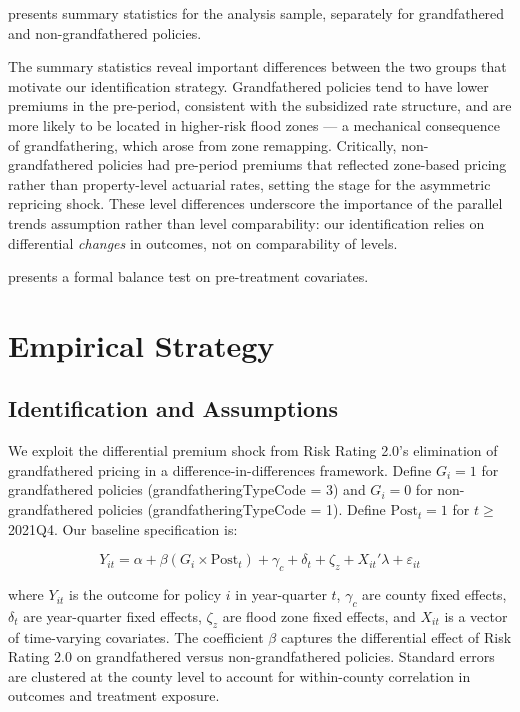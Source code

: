 \documentclass[12pt]{article}
\begin{document}
 presents summary statistics for the analysis sample, separately for grandfathered and non-grandfathered policies.



The summary statistics reveal important differences between the two groups that motivate our identification strategy. Grandfathered policies tend to have lower premiums in the pre-period, consistent with the subsidized rate structure, and are more likely to be located in higher-risk flood zones --- a mechanical consequence of grandfathering, which arose from zone remapping. Critically, non-grandfathered policies had pre-period premiums that reflected zone-based pricing rather than property-level actuarial rates, setting the stage for the asymmetric repricing shock. These level differences underscore the importance of the parallel trends assumption rather than level comparability: our identification relies on differential \textit{changes} in outcomes, not on comparability of levels.

 presents a formal balance test on pre-treatment covariates.




\section{Empirical Strategy}
\label{sec:strategy}

\subsection{Identification and Assumptions}

We exploit the differential premium shock from Risk Rating 2.0's elimination of grandfathered pricing in a difference-in-differences framework. Define $G_i = 1$ for grandfathered policies (grandfatheringTypeCode = 3) and $G_i = 0$ for non-grandfathered policies (grandfatheringTypeCode = 1). Define $\text{Post}_t = 1$ for $t \geq$ 2021Q4. Our baseline specification is:

\begin{equation}
\label{eq:did}
Y_{it} = \alpha + \beta (G_i \times \text{Post}_t) + \gamma_c + \delta_t + \zeta_z + X_{it}'\lambda + \varepsilon_{it}
\end{equation}

\noindent where $Y_{it}$ is the outcome for policy $i$ in year-quarter $t$, $\gamma_c$ are county fixed effects, $\delta_t$ are year-quarter fixed effects, $\zeta_z$ are flood zone fixed effects, and $X_{it}$ is a vector of time-varying covariates. The coefficient $\beta$ captures the differential effect of Risk Rating 2.0 on grandfathered versus non-grandfathered policies. Standard errors are clustered at the county level to account for within-county correlation in outcomes and treatment exposure.
\end{document}
